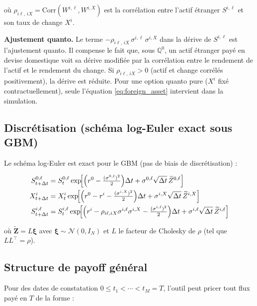 \documentclass[a4paper,11pt]{article}
\begin{document}
o\`u $\rho_{i\ell,\,iX} = \text{Corr}(W^{i,\ell}, W^{i,X})$ est la corr\'elation entre
l'actif \'etranger $S^{i,\ell}$ et son taux de change $X^i$.

\begin{tcolorbox}[math]
\textbf{Ajustement quanto.} Le terme $-\rho_{i\ell,\,iX}\,\sigma^{i,\ell}\,\sigma^{i,X}$
dans la d\'erive de $S^{i,\ell}$ est l'ajustement quanto. Il compense le fait que, sous
$\mathbb{Q}^0$, un actif \'etranger pay\'e en devise domestique voit sa d\'erive modifi\'ee
par la corr\'elation entre le rendement de l'actif et le rendement du change. Si
$\rho_{i\ell,\,iX} > 0$ (actif et change corr\'el\'es positivement), la d\'erive est r\'eduite.
Pour une option quanto pure ($X^i$ fix\'e contractuellement), seule l'\'equation
\eqref{eq:foreign_asset} intervient dans la simulation.
\end{tcolorbox}

\subsection{Discr\'etisation (sch\'ema log-Euler exact sous GBM)}

Le sch\'ema log-Euler est exact pour le GBM (pas de biais de discr\'etisation) :

\begin{align}
  S^{0,\ell}_{t+\Delta t} &= S^{0,\ell}_t \exp\!\Bigl[\Bigl(r^0 - \tfrac{(\sigma^{0,\ell})^2}{2}\Bigr)\Delta t
    + \sigma^{0,\ell}\sqrt{\Delta t}\,\widetilde{Z}^{0,\ell}\Bigr] \\
  X^i_{t+\Delta t} &= X^i_t \exp\!\Bigl[\Bigl(r^0 - r^i - \tfrac{(\sigma^{i,X})^2}{2}\Bigr)\Delta t
    + \sigma^{i,X}\sqrt{\Delta t}\,\widetilde{Z}^{i,X}\Bigr] \\
  S^{i,\ell}_{t+\Delta t} &= S^{i,\ell}_t \exp\!\Bigl[\Bigl(r^i - \rho_{i\ell,iX}\sigma^{i,\ell}\sigma^{i,X}
    - \tfrac{(\sigma^{i,\ell})^2}{2}\Bigr)\Delta t + \sigma^{i,\ell}\sqrt{\Delta t}\,\widetilde{Z}^{i,\ell}\Bigr]
\end{align}

o\`u $\widetilde{\mathbf{Z}} = L \boldsymbol{\xi}$ avec $\boldsymbol{\xi} \sim \mathcal{N}(0, I_N)$
et $L$ le facteur de Cholesky de $\rho$ (tel que $LL^\top = \rho$).

\subsection{Structure de payoff g\'en\'eral}

Pour des dates de constatation $0 \le t_1 < \cdots < t_M = T$, l'outil peut pricer
tout flux pay\'e en $T$ de la forme :
\end{document}
